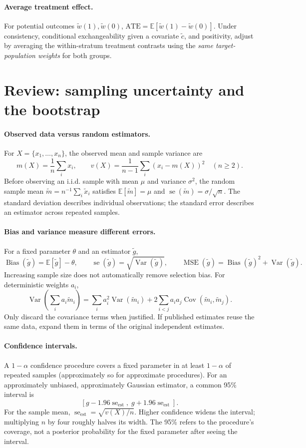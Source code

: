 \documentclass[11pt]{article}
\newcommand{\rv}[1]{\widetilde{#1}}
\newcommand{\E}{\mathbb E}
\newcommand{\Var}{\operatorname{Var}}
\newcommand{\Cov}{\operatorname{Cov}}
\newcommand{\Bias}{\operatorname{Bias}}
\newcommand{\MSE}{\operatorname{MSE}}
\newcommand{\se}{\operatorname{se}}
\begin{document}
\paragraph{Average treatment effect.}
For potential outcomes $\rv w(1),\rv w(0)$,
$\mathrm{ATE}=\E[\rv w(1)-\rv w(0)]$.
Under consistency, conditional exchangeability given a covariate $\rv c$,
and positivity, adjust by averaging the within-stratum treatment contrasts
using the \emph{same target-population weights} for both groups.

\newpage
\section*{Review: sampling uncertainty and the bootstrap}
\paragraph{Observed data versus random estimators.}
For $X=\{x_1,\ldots,x_n\}$, the observed mean and sample variance are
\[
 m(X)=\frac1n\sum_i x_i,\qquad
 v(X)=\frac1{n-1}\sum_i(x_i-m(X))^2\quad(n\geq2).
\]
Before observing an i.i.d. sample with mean $\mu$ and variance $\sigma^2$,
the random sample mean $\rv m=n^{-1}\sum_i\rv x_i$ satisfies
$\E[\rv m]=\mu$ and $\se(\rv m)=\sigma/\sqrt n$.
The standard deviation describes individual observations; the standard error
describes an estimator across repeated samples.

\paragraph{Bias and variance measure different errors.}
For a fixed parameter $\theta$ and an estimator $\rv g$,
\[
 \Bias(\rv g)=\E[\rv g]-\theta,\qquad
 \se(\rv g)=\sqrt{\Var(\rv g)},\qquad
 \MSE(\rv g)=\Bias(\rv g)^2+\Var(\rv g).
\]
Increasing sample size does not automatically remove selection bias.
For deterministic weights $a_i$,
\[
 \Var\!\left(\sum_i a_i\rv m_i\right)
 =\sum_i a_i^2\Var(\rv m_i)
   +2\sum_{i<j}a_i a_j\Cov(\rv m_i,\rv m_j).
\]
Only discard the covariance terms when justified. If published estimates
reuse the same data, expand them in terms of the original independent estimates.

\paragraph{Confidence intervals.}
A $1-\alpha$ confidence procedure covers a fixed parameter in at least
$1-\alpha$ of repeated samples (approximately so for approximate procedures).
For an approximately unbiased, approximately Gaussian estimator, a common
95\% interval is
\[
 [g-1.96\se_{\mathrm{est}},\;g+1.96\se_{\mathrm{est}}].
\]
For the sample mean, $\se_{\mathrm{est}}=\sqrt{v(X)/n}$.
Higher confidence widens the interval; multiplying $n$ by four roughly halves
its width. The 95\% refers to the procedure's coverage, not a posterior
probability for the fixed parameter after seeing the interval.
\end{document}
